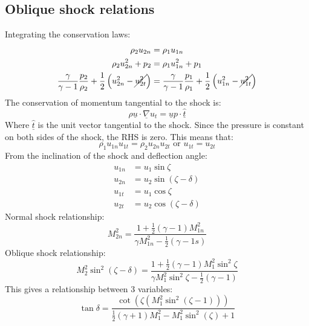 \subsection{Oblique shock relations}
Integrating the conservation laws:
\begin{align}
    \rho_2 u_{2n}                                                                                       & = \rho_1 u_{1n}                                                                                       \\
    \rho_2 u^2_{2n} + p_2                                                                               & = \rho_1 u^2_{1n} + p_1                                                                               \\
    \frac{\gamma}{\gamma - 1}\frac{p_2}{\rho_2} + \frac{1}{2} \left(u^2_{2n} - \cancel{u^2_{2t}}\right) & = \frac{\gamma}{\gamma - 1} \frac{p_1}{\rho_1} + \frac{1}{2}\left(u^2_{1n} - \cancel{u^2_{1t}}\right)
\end{align}
The conservation of momentum tangential to the shock is:
\begin{equation}
    \rho \underline{u} \cdot \underline{\nabla}u_t = \underline{u}p \cdot\underline{\hat{t}}
\end{equation}
Where $\underline{\hat{t}}$ is the unit vector tangential to the shock. Since the pressure is constant on both sides of the shock, the RHS is zero. This means that:
\begin{equation}
    \rho_1 u_{1n}u_{1t} = \rho_2 u_{2n} u_{2t} \textrm{ or } u_{1t} = u_{2t}
\end{equation}
From the inclination of the shock and deflection angle:
\begin{align}
    u_{1n} & = u_1\sin\zeta                        \\
    u_{2n} & = u_2\sin\left(\zeta - \delta\right)  \\
    u_{1t} & = u_1 \cos \zeta                      \\
    u_{2t} & = u_2 \cos\left(\zeta - \delta\right)
\end{align}
Normal shock relationship:
\begin{equation}
    M^2_{2n} = \dfrac{1 + \frac{1}{2}\left(\gamma - 1\right)M^2_{1n}}{\gamma M^2_{1n} - \frac{1}{2}\left(\gamma -1s\right)}
\end{equation}
Oblique shock relationship:
\begin{equation}
    M^2_2 \sin^2 \left(\zeta - \delta\right) = \dfrac{1 + \frac{1}{2}\left(\gamma - 1\right)M^2_1 \sin^2\zeta}{\gamma M^2_1 \sin^2 \zeta-\frac{1}{2}\left(\gamma - 1\right)}
\end{equation}
This gives a relationship between 3 variables:
\begin{equation}
    \tan \delta = \dfrac{\cot \left(\zeta \left(M^2_1 \sin^2\left(\zeta -1\right)\right)\right)}{\frac{1}{2}\left(\gamma + 1\right)M^2_1 - M^2_1 \sin^2 \left(\zeta\right) + 1}
\end{equation}
